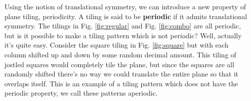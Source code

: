 \documentclass[]{article}
\begin{document}
Using the notion of translational symmetry, we can introduce a new property of plane tiling, periodicity. A tiling is said to be \textbf{periodic} if it admits translational symmetry. The tilings in Fig. \ref{fig:regular} and Fig. \ref{fig:combo} are all periodic, but is it possible to make a tiling pattern which is not periodic? Well, actually it's quite easy. Consider the square tiling in Fig. \ref{fig:square} but with each column shifted up and down by some random decimal amount. This tiling of jostled squares would completely tile the plane, but since the squares are all randomly shifted there's no way we could translate the entire plane so that it overlaps itself. This is an example of a tiling pattern which does not have the periodic property, we call these patterns aperiodic. 
\end{document}
